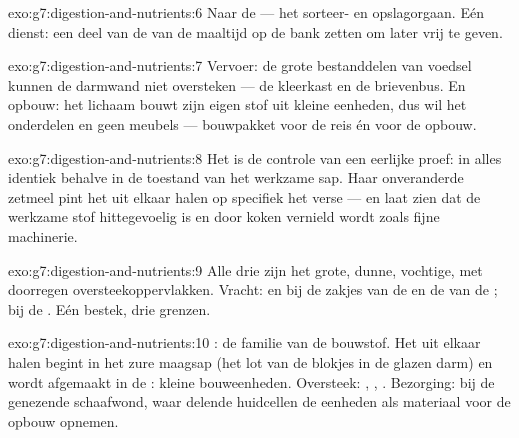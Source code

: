 \begin{solution}{exo:g7:digestion-and-nutrients:6}
Naar de  --- het sorteer- en opslagorgaan. Eén dienst: een deel van
de  van de maaltijd op de bank zetten om later vrij te geven.
\end{solution}

\begin{solution}{exo:g7:digestion-and-nutrients:7}
Vervoer: de grote bestanddelen van voedsel kunnen de darmwand niet
oversteken --- de kleerkast en de brievenbus. En opbouw: het lichaam bouwt
zijn eigen stof uit kleine eenheden, dus wil het onderdelen en geen
meubels --- bouwpakket voor de reis én voor de opbouw.
\end{solution}

\begin{solution}{exo:g7:digestion-and-nutrients:8}
Het is de controle van een eerlijke proef: in alles identiek behalve in de
toestand van het werkzame sap. Haar onveranderde zetmeel pint het uit
elkaar halen op specifiek het verse  --- en laat zien dat de
werkzame stof hittegevoelig is en door koken vernield wordt zoals fijne
machinerie.
\end{solution}

\begin{solution}{exo:g7:digestion-and-nutrients:9}
Alle drie zijn het grote, dunne, vochtige, met  doorregen
oversteekoppervlakken. Vracht:  en  bij de zakjes
van de  en de  van de ;  bij de .
Eén bestek, drie grenzen.
\end{solution}

\begin{solution}{exo:g7:digestion-and-nutrients:10}
: de familie van de bouwstof. Het uit elkaar halen begint in het zure
maagsap (het lot van de blokjes in de glazen darm) en wordt afgemaakt in
de : kleine bouweenheden. Oversteek: , , .
Bezorging: bij de genezende schaafwond, waar delende huidcellen de
eenheden als materiaal voor de opbouw opnemen.
\end{solution}

